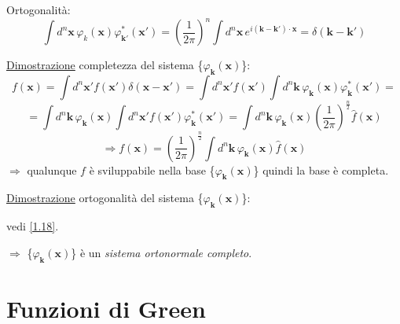\documentclass[a4paper,11pt]{report}
\newcommand{\x}{\boldsymbol{x}}
\newcommand{\xp}{\boldsymbol{x}'}
\newcommand{\kk}{\boldsymbol{k}}
\newcommand{\kp}{\boldsymbol{k}'}
\begin{document}
Ortogonalit\`a:
\begin{equation}
\int d^n\x\,\varphi_{k}(\x)\varphi_{\kp}^{*}(\xp)=\left(\frac{1}{2\pi}\right)^{n}\int d^n\x\, e^{i(\kk-\kp)\cdot\x}=\delta (\kk-\kp)
\label{1.18}
\end{equation}

\underline{Dimostrazione} completezza del sistema \{$\varphi_{\kk}(\x)$\}:
\[
f(\x)=\int d^n\xp f(\xp)\delta(\x-\xp)=
\int d^n\xp f(\xp)\int d^n\kk\,\varphi_{\kk}(\x)\varphi_{\kk}^{*}(\xp)=
\]
\[
=\int d^n\kk\,\varphi_{\kk}(\x)\int d^n\xp f(\xp)\varphi_{\kk}^{*}(\xp)=
\int d^n\kk\,\varphi_{\kk}(\x)\left(\frac{1}{2\pi}\right)^{\frac{n}{2}}\hat{f}(\x)
\]
\[
\Rightarrow f(\x)=\left(\frac{1}{2\pi}\right)^{\frac{n}{2}}\int d^n\kk\,\varphi_{\kk}(\x)\hat{f}(\x)
\]
$\Rightarrow$ qualunque $f$ \`e sviluppabile nella base \{$\varphi_{\kk}(\x)$\} quindi la base \`e completa.

\medskip

\underline{Dimostrazione} ortogonalit\`a del sistema \{$\varphi_{\kk}(\x)$\}:

vedi \eqref{1.18}.

\medskip

$\Rightarrow$ \{$\varphi_{\kk}(\x)$\} \`e un \emph{sistema ortonormale completo}.

\section{Funzioni di Green}
\end{document}
